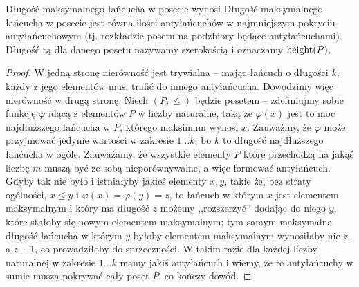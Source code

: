 \begin{theorem}
	Długość maksymalnego łańcucha w posecie wynosi
	Długość maksymalnego łańcucha w posecie jest równa ilości antyłańcuchów w najmniejszym pokryciu antyłańcuchowym
	(tj. rozkładzie posetu na podzbiory będące antyłańcuchami).
	Długość tą dla danego posetu nazywamy szerokością i oznaczamy \(\text{height}(P)\).
\end{theorem}

\begin{proof}
	W jedną stronę nierówność jest trywialna -- mając łańcuch o długości \(k\), każdy z jego
	elementów musi trafić do innego antyłańcucha. Dowodzimy więc nierówność w drugą stronę.
	Niech \((P, \leq)\) będzie posetem -- zdefiniujmy sobie funkcję \(\varphi\) idącą z elementów
	\(P\) w liczby naturalne, taką że \(\varphi(x)\) jest to moc najdłuższego łańcucha w \(P\),
	którego maksimum wynosi \(x\). Zauważmy, że \(\varphi\) może przyjmować jedynie wartości
	w zakresie \(1 \dots k\), bo \(k\) to długość najdłuższego łanćucha w ogóle. Zauważamy,
	że wszystkie elementy \(P\) które przechodzą na jakąś liczbę \(m\) muszą być ze sobą
	nieporównywalne, a więc formować antyłańcuch. Gdyby tak nie było i istniałyby jakieś
	elementy \(x, y\), takie że, bez straty ogólności, \(x \leq y\) i
	\(\varphi(x) = \varphi(y) = z\), to łańcuch w którym \(x\) jest elementem maksymalnym
	i który ma długość \(z\) możemy ,,rozszerzyć'' dodając do niego \(y\), które stałoby się
	nowym elementem maksymalnym; tym samym maksymalna długość łańcucha w którym \(y\)
	byłoby elementem maksymalnym wynosiłaby nie \(z\), a \(z+1\), co prowadziłoby do sprzeczności.
	W takim razie dla każdej liczby naturalnej w zakresie \(1 \dots k\) mamy jakiś antyłańcuch
	i wiemy, że te antyłańcuchy w sumie muszą pokrywać cały poset \(P\), co kończy dowód.
\end{proof}
